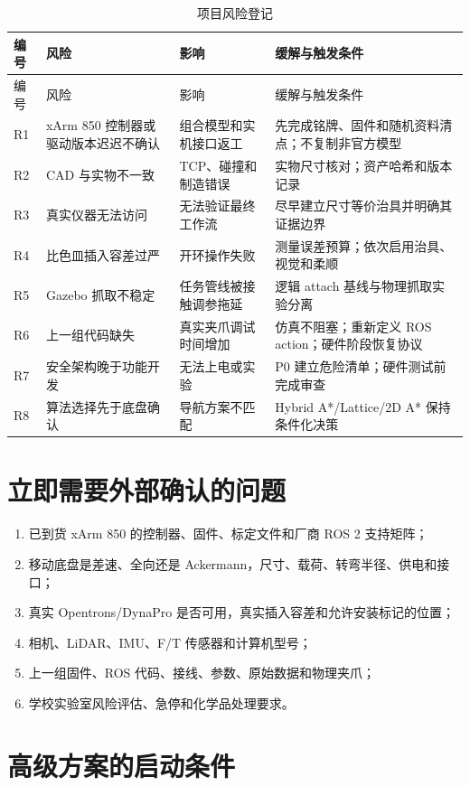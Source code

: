 \documentclass[UTF8,12pt,oneside]{ctexrep}
\begin{document}
\begin{longtable}{L{1.15cm}L{4.05cm}L{3.25cm}L{6.15cm}}
\caption{项目风险登记}\\
\toprule
编号 & 风险 & 影响 & 缓解与触发条件 \\
\midrule
\endfirsthead
\toprule
编号 & 风险 & 影响 & 缓解与触发条件 \\
\midrule
\endhead
R1 & xArm 850 控制器或驱动版本迟迟不确认 & 组合模型和实机接口返工 & 先完成铭牌、固件和随机资料清点；不复制非官方模型 \\
R2 & CAD 与实物不一致 & TCP、碰撞和制造错误 & 实物尺寸核对；资产哈希和版本记录 \\
R3 & 真实仪器无法访问 & 无法验证最终工作流 & 尽早建立尺寸等价治具并明确其证据边界 \\
R4 & 比色皿插入容差过严 & 开环操作失败 & 测量误差预算；依次启用治具、视觉和柔顺 \\
R5 & Gazebo 抓取不稳定 & 任务管线被接触调参拖延 & 逻辑 attach 基线与物理抓取实验分离 \\
R6 & 上一组代码缺失 & 真实夹爪调试时间增加 & 仿真不阻塞；重新定义 ROS action；硬件阶段恢复协议 \\
R7 & 安全架构晚于功能开发 & 无法上电或实验 & P0 建立危险清单；硬件测试前完成审查 \\
R8 & 算法选择先于底盘确认 & 导航方案不匹配 & Hybrid A*/Lattice/2D A* 保持条件化决策 \\
\bottomrule
\end{longtable}

\section{立即需要外部确认的问题}

\begin{enumerate}
  \item 已到货 xArm 850 的控制器、固件、标定文件和厂商 ROS 2 支持矩阵；
  \item 移动底盘是差速、全向还是 Ackermann，尺寸、载荷、转弯半径、供电和接口；
  \item 真实 Opentrons/DynaPro 是否可用，真实插入容差和允许安装标记的位置；
  \item 相机、LiDAR、IMU、F/T 传感器和计算机型号；
  \item 上一组固件、ROS 代码、接线、参数、原始数据和物理夹爪；
  \item 学校实验室风险评估、急停和化学品处理要求。
\end{enumerate}

\section{高级方案的启动条件}
\end{document}
